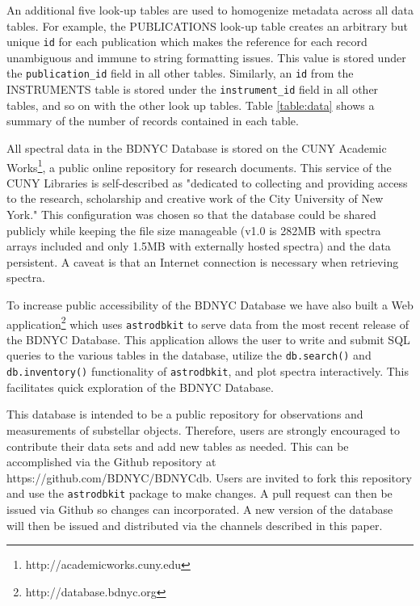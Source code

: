 \documentclass[iop,revtex4,natbib209]{emulateapj}
\begin{document}
An additional five look-up tables are used to homogenize metadata across all data tables. For example, the PUBLICATIONS look-up table creates an arbitrary but unique \texttt{id} for each publication which makes the reference for each record unambiguous and immune to string formatting issues. This value is stored under the \texttt{publication\_id} field in all other tables. Similarly, an \texttt{id} from the INSTRUMENTS table is stored under the \texttt{instrument\_id} field in all other tables, and so on with the other look up tables. Table \ref{table:data} shows a summary of the number of records contained in each table.

All spectral data in the BDNYC Database is stored on the CUNY Academic Works\footnote{http://academicworks.cuny.edu}, a public online repository for research documents. This service of the CUNY Libraries is self-described as "dedicated to collecting and providing access to the research, scholarship and creative work of the City University of New York." This configuration was chosen so that the database could be shared publicly while keeping the file size manageable (v1.0 is 282MB with spectra arrays included and only 1.5MB with externally hosted spectra) and the data persistent. A caveat is that an Internet connection is necessary when retrieving spectra.

To increase public accessibility of the BDNYC Database we have also built a Web application\footnote{http://database.bdnyc.org} which uses \texttt{astrodbkit} to serve data from the most recent release of the BDNYC Database. This application allows the user to write and submit SQL queries to the various tables in the database, utilize the \texttt{db.search()} and \texttt{db.inventory()} functionality of \texttt{astrodbkit}, and plot spectra interactively. This facilitates quick exploration of the BDNYC Database.

This database is intended to be a public repository for observations and measurements of substellar objects. Therefore, users are strongly encouraged to contribute their data sets and add new tables as needed. This can be accomplished via the Github repository at https://github.com/BDNYC/BDNYCdb. Users are invited to fork this repository and use the \texttt{astrodbkit} package to make changes. A pull request can then be issued via Github so changes can incorporated. A new version of the database will then be issued and distributed via the channels described in this paper.

\end{document}
